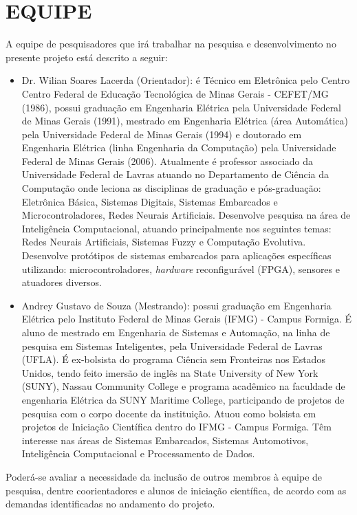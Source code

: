 \chapter{EQUIPE}
\label{cap:equipe}

A equipe de pesquisadores que irá trabalhar na pesquisa e desenvolvimento no presente projeto está descrito a seguir:

\begin{itemize}
	\item Dr. Wilian Soares Lacerda (Orientador): é Técnico em Eletrônica pelo Centro Centro Federal de Educação Tecnológica de Minas Gerais - CEFET/MG (1986), possui graduação em Engenharia Elétrica pela Universidade Federal de Minas Gerais (1991), mestrado em Engenharia Elétrica (área Automática) pela Universidade Federal de Minas Gerais (1994) e doutorado em Engenharia Elétrica (linha Engenharia da Computação) pela Universidade Federal de Minas Gerais (2006). Atualmente é professor associado da Universidade Federal de Lavras atuando no Departamento de Ciência da Computação onde leciona as disciplinas de graduação e pós-graduação: Eletrônica Básica, Sistemas Digitais, Sistemas Embarcados e Microcontroladores, Redes Neurais Artificiais. Desenvolve pesquisa na área de Inteligência Computacional, atuando principalmente nos seguintes temas: Redes Neurais Artificiais, Sistemas Fuzzy e Computação Evolutiva. Desenvolve protótipos de sistemas embarcados para aplicações específicas utilizando: microcontroladores, \textit{hardware} reconfigurável (FPGA), sensores e atuadores diversos.
	
	\item Andrey Gustavo de Souza (Mestrando): possui graduação em Engenharia Elétrica pelo Instituto Federal de Minas Gerais (IFMG) - Campus Formiga. É aluno de mestrado em Engenharia de Sistemas e Automação, na linha de pesquisa em Sistemas Inteligentes, pela Universidade Federal de Lavras (UFLA). É ex-bolsista do programa Ciência sem Fronteiras nos Estados Unidos, tendo feito imersão de inglês na State University of New York (SUNY), Nassau Community College e programa acadêmico na faculdade de engenharia Elétrica da SUNY Maritime College, participando de projetos de pesquisa com o corpo docente da instituição. Atuou como bolsista em projetos de Iniciação Científica dentro do IFMG - Campus Formiga. Têm interesse nas áreas de Sistemas Embarcados, Sistemas Automotivos, Inteligência Computacional e Processamento de Dados.
\end{itemize}

Poderá-se avaliar a necessidade da inclusão de outros membros à equipe de pesquisa, dentre coorientadores e alunos de iniciação científica, de acordo com as demandas identificadas no andamento do projeto.